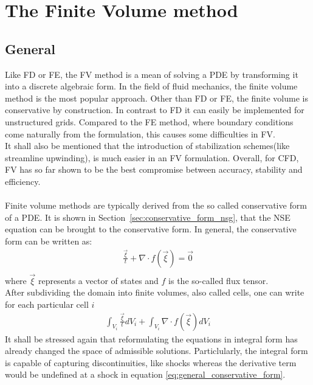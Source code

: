 \documentclass[../main.tex]{subfiles}
\begin{document}
\setlength{\delimitershortfall}{0pt}

\section{The Finite Volume method}\label{sec:finite_volume_method}
\subsection{General}
Like \ac{FD} or \acf{FE}, the \acf{FV} method is a mean of solving a \ac{PDE} by transforming it into a discrete algebraic form. In the field of fluid mechanics, the finite volume method is the most popular approach. Other than \ac{FD} or \ac{FE}, the finite volume is conservative by construction. In contrast to \ac{FD} it can easily be implemented for unstructured grids. Compared to the \ac{FE} method, where boundary conditions come naturally from the formulation, this causes some difficulties in \ac{FV}.\\
It shall also be mentioned that the introduction of stabilization schemes(like streamline upwinding), is much easier in an \ac{FV} formulation.
Overall, for \ac{CFD}, \ac{FV} has so far shown to be the best compromise between accuracy, stability and efficiency.
 \\
 \\
Finite volume methods are typically derived from the so called conservative form of a \ac{PDE}. It is shown in Section~\ref{sec:conservative_form_nsg}, that the \ac{NSE} equation can be  brought to the conservative form. In general, the conservative form can be written as:
\begin{align}\label{eq:general_conservative_form}
\tfrac{\vec{\xi}}{t}+\nabla\cdot f(\vec{\xi}) = \vec{0} \\
\end{align}
where $\vec{\xi}$ represents a vector of states and $f$ is the so-called flux tensor.\\
After subdividing the domain into finite volumes, also called cells, one can write for each particular cell $i$
\begin{align}
\int_{V_i} \tfrac{\vec{\xi}}{t} dV_i + \int_{V_i} \nabla\cdot f(\vec{\xi}) dV_i
\end{align}
It shall be stressed again that reformulating the equations in integral form has already changed the space of admissible solutions. Particlularly, the integral form is capable of capturing discontinuities, like shocks whereas the derivative term would be undefined  at a shock in equation \eqref{eq:general_conservative_form}.
\end{document}
